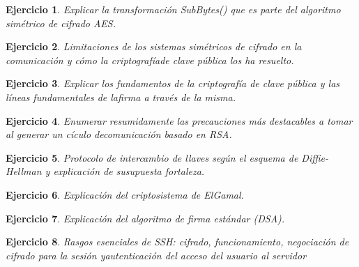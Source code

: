 \documentclass[
  a4paper,
  spanish,
  12pt,
]{scrartcl}
\theoremstyle{ejercicio-style}
\newtheorem{ejer}{Ejercicio}
\theoremstyle{remark-style}
\begin{document}
\begin{ejer}
  Explicar la transformación SubBytes() que es parte del algoritmo simétrico de cifrado AES.
\end{ejer}

\begin{ejer}
  Limitaciones de los sistemas simétricos de cifrado en la comunicación y cómo la criptografíade clave pública los ha resuelto.
\end{ejer}

\begin{ejer}
  Explicar los fundamentos de la criptografía de clave pública y las líneas fundamentales de lafirma a través de la misma.
\end{ejer}

\begin{ejer}
  Enumerar resumidamente las precauciones más destacables a tomar al generar un cículo decomunicación basado en RSA.
\end{ejer}

\begin{ejer}
  Protocolo de intercambio de llaves según el esquema de Diffie-Hellman y explicación de susupuesta fortaleza.
\end{ejer}

\begin{ejer}
  Explicación del criptosistema de ElGamal.
\end{ejer}

\begin{ejer}
  Explicación del algoritmo de firma estándar (DSA).
\end{ejer}

\begin{ejer}
  Rasgos esenciales de SSH: cifrado, funcionamiento, negociación de cifrado para la sesión yautenticación del acceso del usuario al servidor
\end{ejer}
\end{document}
